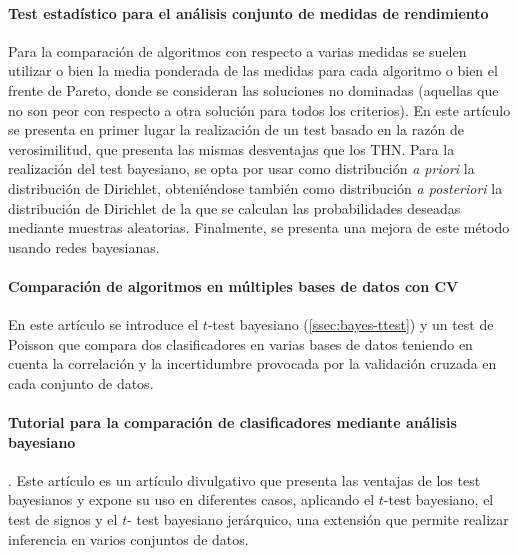 \paragraph{Test estadístico para el análisis conjunto de 
medidas de rendimiento} \cite{BENAVOLI15b}	Para la 
comparación de algoritmos con respecto a varias medidas
se suelen utilizar o bien la media ponderada de las medidas
para cada algoritmo o bien el frente de Pareto, donde se 
consideran las soluciones no dominadas (aquellas que no son
peor con respecto a otra solución para todos los criterios).
En este artículo se presenta en primer lugar la realización 
de un test basado en la razón de verosimilitud, que presenta
las mismas desventajas que los THN. Para la realización del
test bayesiano, se opta por usar como distribución 
\textit{a priori} la distribución de Dirichlet, obteniéndose
también como distribución \textit{a posteriori} la 
distribución de Dirichlet de la que se calculan las 
probabilidades deseadas mediante muestras aleatorias.
Finalmente, se presenta una mejora de este método usando
redes bayesianas.

\paragraph{Comparación de algoritmos en múltiples bases de 
datos con CV} \cite{CORANI15} En este artículo se introduce
el $t$-test bayesiano (\ref{ssec:bayes-ttest}) y un test de 
Poisson que compara dos clasificadores en varias bases de 
datos teniendo en cuenta la correlación y la incertidumbre 
provocada por la validación cruzada en cada conjunto de 
datos.

\paragraph{Tutorial para la comparación de clasificadores 
mediante análisis bayesiano}. \cite{BENAVOLI16} Este artículo 
es un artículo divulgativo que presenta las ventajas de los 
test bayesianos y expone su uso en diferentes casos, 
aplicando el $t$-test bayesiano, el test de signos y el $t$-
test bayesiano jerárquico, una extensión que permite realizar 
inferencia en varios conjuntos de datos.











